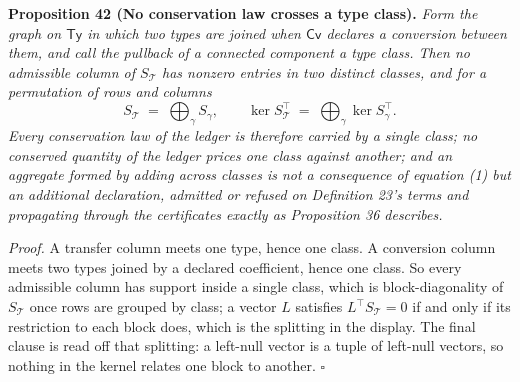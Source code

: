 \documentclass[11pt]{article}
\begin{document}
\textbf{Proposition 42 (No conservation law crosses a type class).} \emph{Form the graph on \(\mathsf{Ty}\) in which two
types are joined when \(\mathsf{Cv}\) declares a conversion between them, and call the pullback of a connected
component a type class. Then no admissible column of \(S_{\mathcal{T}}\) has nonzero entries in two distinct
classes, and for a permutation of rows and columns}
\[ S_{\mathcal{T}} \;=\; \bigoplus_{\gamma} S_{\gamma}, \qquad \ker S_{\mathcal{T}}^{\top} \;=\; \bigoplus_{\gamma} \ker S_{\gamma}^{\top} . \]
\emph{Every conservation law of the ledger is therefore carried by a single class; no conserved quantity of the
ledger prices one class against another; and an aggregate formed by adding across classes is not a consequence
of equation (1) but an additional declaration, admitted or refused on Definition 23's terms and propagating
through the certificates exactly as Proposition 36 describes.}

\emph{Proof.} A transfer column meets one type, hence one class. A conversion column meets two types joined by a
declared coefficient, hence one class. So every admissible column has support inside a single class, which is
block-diagonality of \(S_{\mathcal{T}}\) once rows are grouped by class; a vector \(L\) satisfies
\(L^{\top} S_{\mathcal{T}} = 0\) if and only if its restriction to each block does, which is the splitting in the
display. The final clause is read off that splitting: a left-null vector is a tuple of left-null vectors, so
nothing in the kernel relates one block to another. \ensuremath{\square}
\end{document}
